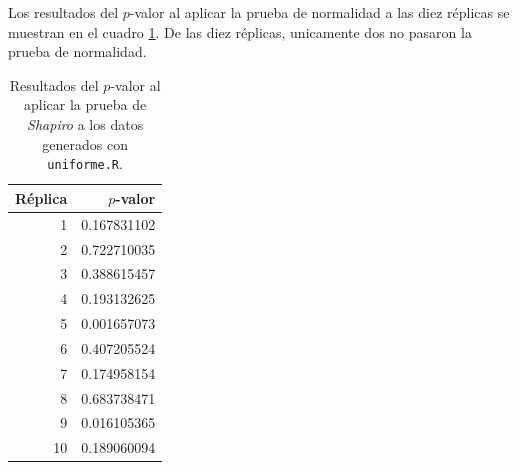 \documentclass[12pt]{article}
\begin{document}
	Los resultados del $p$-valor al aplicar la prueba de normalidad a las diez réplicas se muestran en el cuadro \ref{pvalor-normal-bueno}. De las diez réplicas, unicamente dos no pasaron la prueba de normalidad. 
	
	\begin{table}
	\centering
	\caption{Resultados del $p$-valor al aplicar la prueba de {\em Shapiro} a los datos generados con \texttt{uniforme.R}.}
	\label{pvalor-normal-bueno}
	\begin{tabular}{rr}
		\hline
		Réplica & $p$-valor \\
		\hline
		1 &  0.167831102 \\
		2 & 0.722710035 \\
		3 &  0.388615457 \\
		4 &  0.193132625 \\
		5 &  0.001657073 \\
		6 &  0.407205524 \\
		7 &  0.174958154 \\
		8 &  0.683738471 \\
		9 &  0.016105365 \\
		10 & 0.189060094 \\
		\hline
	\end{tabular}
\end{table}
	



\end{document}
